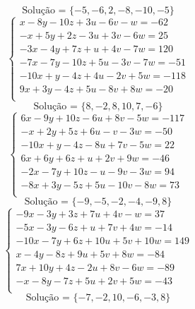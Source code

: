 \documentclass[12pt,oneside,a4paper]{article}
\begin{document}
\begin{equation*}
\text{Solução = }\{-5,-6,2,-8,-10,-5\}
\end{equation*}
\vspace{\baselineskip}
\begin{equation*}
\begin{cases}
x-8y-10z+3u-6v-w=-62 \\
-x+5y+2z-3u+3v-6w=25 \\
-3x-4y+7z+u+4v-7w=120 \\
-7x-7y-10z+5u-3v-7w=-51 \\
-10x+y-4z+4u-2v+5w=-118 \\
9x+3y-4z+5u-8v+8w=-20 \\
\end{cases}
\end{equation*}
\begin{equation*}
\text{Solução = }\{8,-2,8,10,7,-6\}
\end{equation*}
\vspace{\baselineskip}
\begin{equation*}
\begin{cases}
6x-9y+10z-6u+8v-5w=-117 \\
-x+2y+5z+6u-v-3w=-50 \\
-10x+y-4z-8u+7v-5w=22 \\
6x+6y+6z+u+2v+9w=-46 \\
-2x-7y+10z-u-9v-3w=94 \\
-8x+3y-5z+5u-10v-8w=73 \\
\end{cases}
\end{equation*}
\begin{equation*}
\text{Solução = }\{-9,-5,-2,-4,-9,8\}
\end{equation*}
\vspace{\baselineskip}
\begin{equation*}
\begin{cases}
-9x-3y+3z+7u+4v-w=37 \\
-5x-3y-6z+u+7v+4w=-14 \\
-10x-7y+6z+10u+5v+10w=149 \\
x-4y-8z+9u+5v+8w=-84 \\
7x+10y+4z-2u+8v-6w=-89 \\
-x-8y-7z+5u+2v+5w=-43 \\
\end{cases}
\end{equation*}
\begin{equation*}
\text{Solução = }\{-7,-2,10,-6,-3,8\}
\end{equation*}
\end{document}
